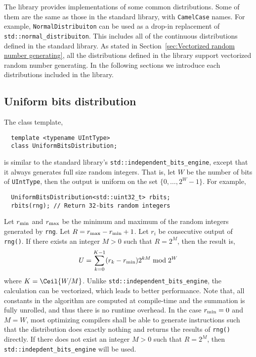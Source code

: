 The library provides implementations of some common distributions. Some of them
are the same as those in the standard library, with \verb|CamelCase| names. For
example, \verb|NormalDistribuiton| can be used as a drop-in replacement of
\verb|std::normal_distribuiton|. This includes all of the continuous
distributions defined in the standard library. As stated in
Section~\ref{sec:Vectorized random number generating}, all the distributions
defined in the library support vectorized random number generating. In the
following sections we introduce each distributions included in the library.

\subsection{Uniform bits distribution}
\label{sub:Uniform bits distribution}

The class template,
\begin{Verbatim}
  template <typename UIntType>
  class UniformBitsDistribution;
\end{Verbatim}
is similar to the standard library's \verb|std::independent_bits_engine|,
except that it always generates full size random integers. That is, let $W$ be
the number of bits of \verb|UIntType|, then the output is uniform on the set
$\{0,\dots,2^W - 1\}$. For example,
\begin{Verbatim}
  UniformBitsDistribution<std::uint32_t> rbits;
  rbits(rng); // Return 32-bits random integers
\end{Verbatim}
Let $r_{\mathrm{min}}$ and $r_{\mathrm{max}}$ be the minimum and maximum of the random integers
generated by \verb|rng|. Let $R = r_{\mathrm{max}} - r_{\mathrm{min}} + 1$. Let $r_i$ be consecutive
output of \verb|rng()|. If there exists an integer $M > 0$ such that $R = 2^M$,
then the result is,
\begin{equation*}
  U = \sum_{k = 0}^{K - 1} (r_k - r_{\mathrm{min}}) 2^{kM} \bmod 2^W
\end{equation*}
where $K = \Ceil{W / M}$. Unlike \verb|std::independent_bits_engine|, the
calculation can be vectorized, which leads to better performance. Note that,
all constants in the algorithm are computed at compile-time and the summation
is fully unrolled, and thus there is no runtime overhead. In the case $r_{\mathrm{min}} =
0$ and $M = W$, most optimizing compilers shall be able to generate
instructions such that the distribution does exactly nothing and returns the
results of \verb|rng()| directly. If there does not exist an integer $M > 0$
such that $R = 2^M$, then \verb|std::indepdent_bits_engine| will be used.

